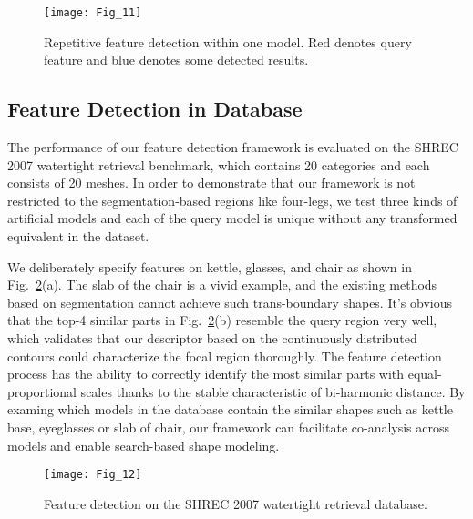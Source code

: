 \begin{figure}[!to]
\begin{center}
\texttt{[image: Fig\_11]}
\end{center}
\caption[Repetitive feature detection within one model.]
  {Repetitive feature detection within one model. Red
  denotes query feature and blue denotes some detected
  results.}
\label{detect_self}
\end{figure}

\subsection{Feature Detection in Database}

The performance of our feature detection framework is evaluated on
the SHREC 2007 watertight retrieval benchmark, which contains 20
categories and each consists of 20 meshes. In order to demonstrate
that our framework is not restricted to the segmentation-based regions
like four-legs, we test three kinds of artificial models and each of
the query model is unique without any transformed equivalent in the
dataset.

We deliberately specify features on kettle, glasses, and chair as
shown in Fig.~\ref{detect_database_1}(a). The slab of the chair is a
vivid example, and the existing methods based on segmentation cannot
achieve such trans-boundary shapes. It's obvious that the top-4
similar parts in Fig.~\ref{detect_database_1}(b) resemble the query
region very well, which validates that our descriptor based on the
continuously distributed contours could characterize the focal region
thoroughly. The feature detection process has the ability to correctly
identify the most similar parts with equal-proportional scales thanks
to the stable characteristic of bi-harmonic distance. By examing which
models in the database contain the similar shapes such as kettle base,
eyeglasses or slab of chair, our framework can facilitate co-analysis
across models and enable search-based shape modeling.


\begin{figure}[!to]
\texttt{[image: Fig\_12]}
\caption[Feature detection on the SHREC 2007 watertight retrieval
  database.]
  {Feature detection on the SHREC 2007 watertight retrieval
  database.}
\label{detect_database_1}
\end{figure}


